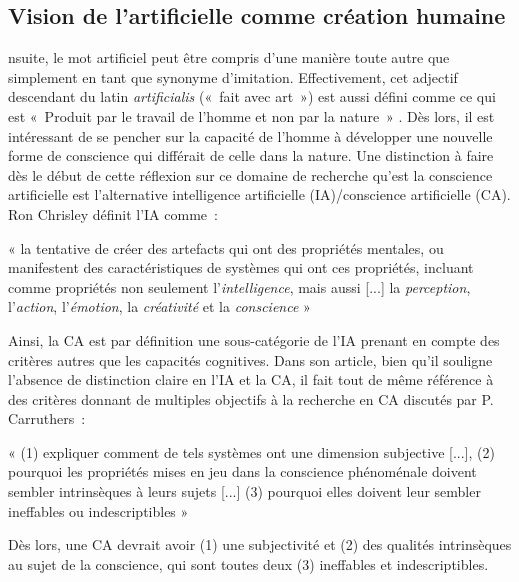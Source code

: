 \documentclass[a4paper, titlepage, 12pt]{article}
\newenvironment{longquote}%
{\vspace{-9pt}\begin{center}\begin{minipage}{120mm}\singlespacing\footnotesize «}%
{»\end{minipage}\end{center}\vspace{9pt}}
\begin{document}
	\subsection{Vision de l'artificielle comme création humaine}
	nsuite, le mot artificiel peut être compris d'une manière toute autre que simplement en tant que synonyme d’imitation. Effectivement, cet adjectif descendant du latin \textit{artificialis} («~fait avec art~») \cite{wiktionnaireArtificiel2025} est aussi défini comme ce qui est «~Produit par le travail de l'homme et non par la nature~» \cite{larousseArtificiel}. Dès lors, il est intéressant de se pencher sur la capacité de l’homme à développer une nouvelle forme de conscience qui différait de celle dans la nature. Une distinction à faire dès le début de cette réflexion sur ce domaine de recherche qu’est la conscience artificielle est l’alternative intelligence artificielle (IA)/conscience artificielle (CA). Ron Chrisley définit l’IA comme~: \cite{chrisleyPhilosophicalFoundationsArtificial2008}
	\begin{longquote}
		la tentative de créer des artefacts qui ont des propriétés mentales, ou manifestent des caractéristiques de systèmes qui ont ces propriétés, incluant comme propriétés non seulement l'\textit{intelligence}, mais aussi [...] la \textit{perception}, l’\textit{action}, l'\textit{émotion}, la \textit{créativité} et la \textit{conscience}
	\end{longquote}

	Ainsi, la CA est par définition une sous-catégorie de l’IA prenant en compte des critères autres que les capacités cognitives. Dans son article, bien qu’il souligne l’absence de distinction claire en l’IA et la CA, il fait tout de même référence à des critères donnant de multiples objectifs à la recherche en CA discutés par P. Carruthers~: \cite{carruthersPhenomenalConsciousnessNaturalistic2000}
	\begin{longquote}
		(1) expliquer comment de tels systèmes ont une dimension subjective [...], (2) pourquoi les propriétés mises en jeu dans la conscience phénoménale doivent sembler intrinsèques à leurs sujets [...] (3) pourquoi elles doivent leur sembler ineffables ou indescriptibles
	\end{longquote}

	Dès lors, une CA devrait avoir (1) une subjectivité et (2) des qualités intrinsèques au sujet de la conscience, qui sont toutes deux (3) ineffables et indescriptibles.
\end{document}

